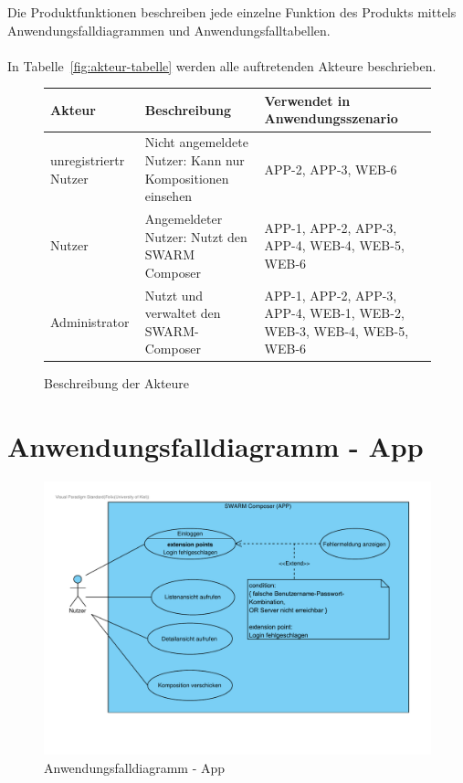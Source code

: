 Die Produktfunktionen beschreiben jede einzelne Funktion des Produkts mittels Anwendungsfalldiagrammen und Anwendungsfalltabellen.
\\\\
In  Tabelle~\autoref{fig:akteur-tabelle} werden alle auftretenden Akteure beschrieben.


\begin{figure}[h]
	\centering

	\begin{tabularx}{\textwidth}{ p{} | p{} | X }
		\textbf{Akteur} & \textbf{Beschreibung} & \textbf{Verwendet in Anwendungsszenario} \\ \hline
		unregistriertr Nutzer & Nicht angemeldete Nutzer: Kann nur Kompositionen einsehen & APP-2, APP-3, WEB-6
		\\ \hline Nutzer & Angemeldeter Nutzer: Nutzt den SWARM Composer & APP-1, APP-2, APP-3, APP-4, WEB-4, WEB-5, WEB-6
		\\ \hline Administrator & Nutzt und verwaltet den SWARM-Composer & APP-1, APP-2, APP-3, APP-4, WEB-1, WEB-2, WEB-3, WEB-4, WEB-5, WEB-6
	\end{tabularx}

	\caption{Beschreibung der Akteure}
	\label{fig:akteur-tabelle}
\end{figure}


\newpage

\section{Anwendungsfalldiagramm - App}

\begin{figure}[h]
	\centering	
	\includegraphics[width=\textwidth]{img/Produktfunktionen_app}	
	\caption{Anwendungsfalldiagramm - App}
	\label{fig:anwendungsfalldiagramm-app}
\end{figure}

